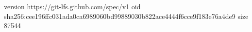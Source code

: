 version https://git-lfs.github.com/spec/v1
oid sha256:cee196ffc031ada0ca6989060bd99889030b822ace4444f6cce9f183e76a4de9
size 87544
